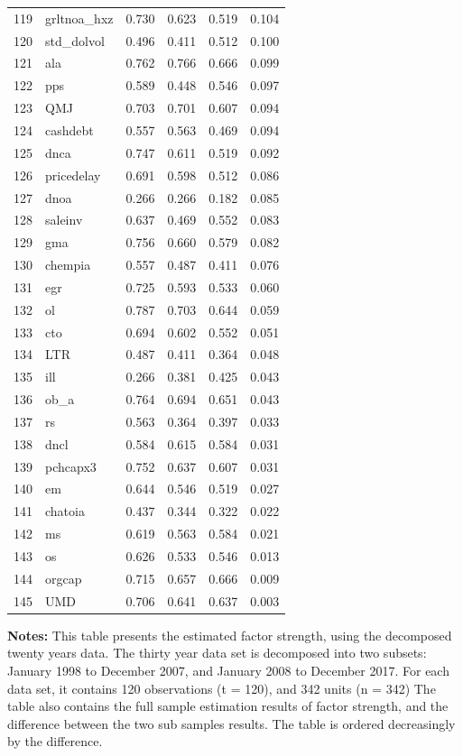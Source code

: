 \begin{footnotesize}
\begin{longtable}{rl|c|c|c|c}
		119 & grltnoa\_hxz & 0.730 & 0.623 & 0.519 & 0.104 \\ 
		120 & std\_dolvol & 0.496 & 0.411 & 0.512 & 0.100 \\ 
		121 & ala & 0.762 & 0.766 & 0.666 & 0.099 \\ 
		122 & pps & 0.589 & 0.448 & 0.546 & 0.097 \\ 
		123 & QMJ & 0.703 & 0.701 & 0.607 & 0.094 \\ 
		124 & cashdebt & 0.557 & 0.563 & 0.469 & 0.094 \\ 
		125 & dnca & 0.747 & 0.611 & 0.519 & 0.092 \\ 
		126 & pricedelay & 0.691 & 0.598 & 0.512 & 0.086 \\ 
		127 & dnoa & 0.266 & 0.266 & 0.182 & 0.085 \\ 
		128 & saleinv & 0.637 & 0.469 & 0.552 & 0.083 \\ 
		129 & gma & 0.756 & 0.660 & 0.579 & 0.082 \\ 
		130 & chempia & 0.557 & 0.487 & 0.411 & 0.076 \\ 
		131 & egr & 0.725 & 0.593 & 0.533 & 0.060 \\ 
		132 & ol & 0.787 & 0.703 & 0.644 & 0.059 \\ 
		133 & cto & 0.694 & 0.602 & 0.552 & 0.051 \\ 
		134 & LTR & 0.487 & 0.411 & 0.364 & 0.048 \\ 
		135 & ill & 0.266 & 0.381 & 0.425 & 0.043 \\ 
		136 & ob\_a & 0.764 & 0.694 & 0.651 & 0.043 \\ 
		137 & rs & 0.563 & 0.364 & 0.397 & 0.033 \\ 
		138 & dncl & 0.584 & 0.615 & 0.584 & 0.031 \\ 
		139 & pchcapx3 & 0.752 & 0.637 & 0.607 & 0.031 \\ 
		140 & em & 0.644 & 0.546 & 0.519 & 0.027 \\ 
		141 & chatoia & 0.437 & 0.344 & 0.322 & 0.022 \\ 
		142 & ms & 0.619 & 0.563 & 0.584 & 0.021 \\ 
		143 & os & 0.626 & 0.533 & 0.546 & 0.013 \\ 
		144 & orgcap & 0.715 & 0.657 & 0.666 & 0.009 \\ 
		145 & UMD & 0.706 & 0.641 & 0.637 & 0.003 \\ 
		\hline
		
	\end{longtable}
	\begin{minipage}{\textwidth}
		{\footnotesize {\bf Notes:}	This table presents the estimated factor strength, using the decomposed twenty years data.
			The thirty year data set is decomposed into two subsets: January 1998 to December 2007, and January 2008 to December 2017. For each data set, it contains 120 observations (t = 120), and 342 units (n = 342)
			The table also contains the full sample estimation results of factor strength, and the difference between the two sub samples results.
			The table is ordered decreasingly by the difference.}
	\end{minipage}
\end{footnotesize}

